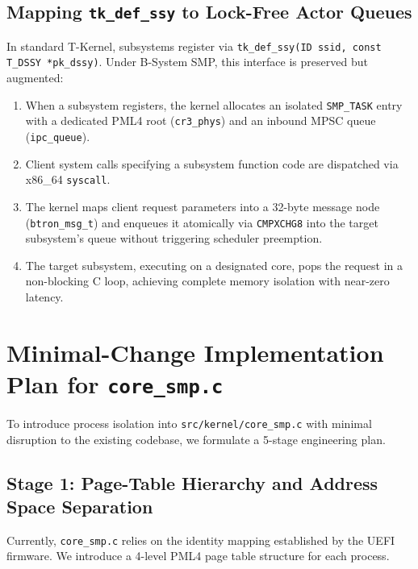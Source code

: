 \documentclass[10pt,journal,compsoc,twocolumn]{article}
\begin{document}
\subsection{Mapping \texttt{tk\_def\_ssy} to Lock-Free Actor Queues}
In standard T-Kernel, subsystems register via \texttt{tk\_def\_ssy(ID ssid, const T\_DSSY *pk\_dssy)}. Under B-System SMP, this interface is preserved but augmented:
\begin{enumerate}[leftmargin=*]
    \item When a subsystem registers, the kernel allocates an isolated \texttt{SMP\_TASK} entry with a dedicated PML4 root (\texttt{cr3\_phys}) and an inbound MPSC queue (\texttt{ipc\_queue}).
    \item Client system calls specifying a subsystem function code are dispatched via x86\_64 \texttt{syscall}.
    \item The kernel maps client request parameters into a 32-byte message node (\texttt{btron\_msg\_t}) and enqueues it atomically via \texttt{CMPXCHG8} into the target subsystem's queue without triggering scheduler preemption.
    \item The target subsystem, executing on a designated core, pops the request in a non-blocking C loop, achieving complete memory isolation with near-zero latency.
\end{enumerate}

\section{Minimal-Change Implementation Plan for \texttt{core\_smp.c}}
\label{sec:core_smp_plan}

To introduce process isolation into \texttt{src/kernel/core\_smp.c} with minimal disruption to the existing codebase, we formulate a 5-stage engineering plan.

\subsection{Stage 1: Page-Table Hierarchy and Address Space Separation}
Currently, \texttt{core\_smp.c} relies on the identity mapping established by the UEFI firmware. We introduce a 4-level PML4 page table structure for each process.
\end{document}
